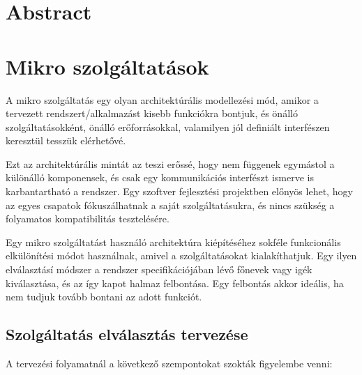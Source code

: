 \documentclass[11pt,magyar,a4paper,oneside,]{report}
\begin{document}
\chapter*{Abstract}\label{abstract}

\chapter{Mikro szolgáltatások\citep{microservices} \citep{micro-arch}
\citep{microservices-light}}\label{mikro-szolguxe1ltatuxe1sokmicroservices-micro-arch-microservices-light}

A mikro szolgáltatás egy olyan architektúrális modellezési mód, amikor a
tervezett rendszert/alkalmazást kisebb funkciókra bontjuk, és önálló
szolgáltatásokként, önálló erőforrásokkal, valamilyen jól definiált
interfészen keresztül tesszük elérhetővé.

Ezt az architektúrális mintát az teszi erőssé, hogy nem függenek
egymástol a különálló komponensek, és csak egy kommunikációs interfészt
ismerve is karbantartható a rendszer. Egy szoftver fejlesztési
projektben előnyös lehet, hogy az egyes csapatok fókuszálhatnak a saját
szolgáltatásukra, és nincs szükség a folyamatos kompatibilitás
tesztelésére.

Egy mikro szolgáltatást használó architektúra kiépítéséhez sokféle
funkcionális elkülönítési módot használnak, amivel a szolgáltatásokat
kialakíthatjuk. Egy ilyen elválasztásí módszer a rendszer
specifikációjában lévő főnevek vagy igék kiválasztása, és az így kapot
halmaz felbontása. Egy felbontás akkor ideális, ha nem tudjuk tovább
bontani az adott funkciót.

\section{Szolgáltatás elválasztás
tervezése}\label{szolguxe1ltatuxe1s-elvuxe1lasztuxe1s-tervezuxe9se}

A tervezési folyamatnál a következő szempontokat szokták figyelembe
venni:
\end{document}
